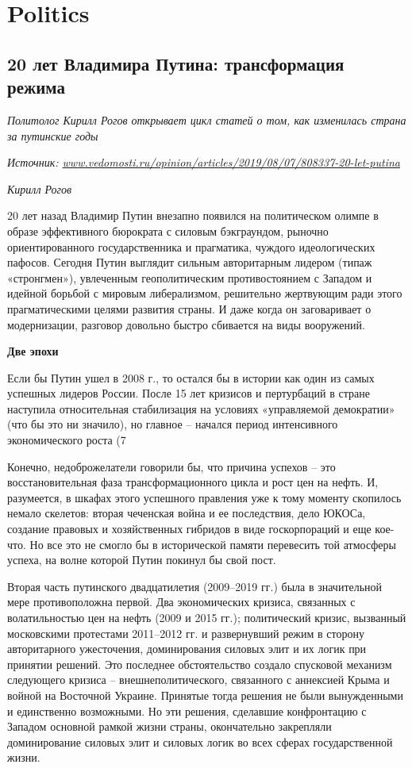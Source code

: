 \chapter{Politics}


\section{20 лет Владимира Путина: трансформация режима}

\textit{Политолог Кирилл Рогов открывает цикл статей о том, как изменилась страна за путинские годы}

\textit{Источник: \url{www.vedomosti.ru/opinion/articles/2019/08/07/808337-20-let-putina}}

\textit{Кирилл Рогов }

20 лет назад Владимир Путин внезапно появился на политическом олимпе в образе эффективного бюрократа с силовым бэкграундом, рыночно ориентированного государственника и прагматика, чуждого идеологических пафосов. Сегодня Путин выглядит сильным авторитарным лидером (типаж «стронгмен»), увлеченным геополитическим противостоянием с Западом и идейной борьбой с мировым либерализмом, решительно жертвующим ради этого прагматическими целями развития страны. И даже когда он заговаривает о модернизации, разговор довольно быстро сбивается на виды вооружений.

\textbf{Две эпохи}



Если бы Путин ушел в 2008 г., то остался бы в истории как один из самых успешных лидеров России. После 15 лет кризисов и пертурбаций в стране наступила относительная стабилизация на условиях «управляемой демократии» (что бы это ни значило), но главное – начался период интенсивного экономического роста (7%

Конечно, недоброжелатели говорили бы, что причина успехов – это восстановительная фаза трансформационного цикла и рост цен на нефть. И, разумеется, в шкафах этого успешного правления уже к тому моменту скопилось немало скелетов: вторая чеченская война и ее последствия, дело ЮКОСа, создание правовых и хозяйственных гибридов в виде госкорпораций и еще кое-что. Но все это не смогло бы в исторической памяти перевесить той атмосферы успеха, на волне которой Путин покинул бы свой пост.

Вторая часть путинского двадцатилетия (2009–2019 гг.) была в значительной мере противоположна первой. Два экономических кризиса, связанных с волатильностью цен на нефть (2009 и 2015 гг.); политический кризис, вызванный московскими протестами 2011–2012 гг. и развернувший режим в сторону авторитарного ужесточения, доминирования силовых элит и их логик при принятии решений. Это последнее обстоятельство создало спусковой механизм следующего кризиса – внешнеполитического, связанного с аннексией Крыма и войной на Восточной Украине. Принятые тогда решения не были вынужденными и единственно возможными. Но эти решения, сделавшие конфронтацию с Западом основной рамкой жизни страны, окончательно закрепляли доминирование силовых элит и силовых логик во всех сферах государственной жизни.

